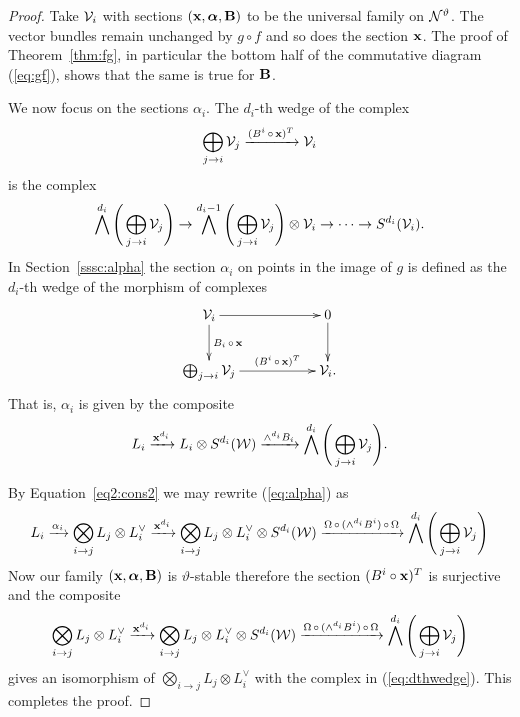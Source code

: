 \documentclass{amsart}
\newcommand{\balpha}{\boldsymbol{\alpha}}
\theoremstyle{definition}
\begin{document}
\begin{proof}
Take $\mathcal{V}_i$ with sections $(\bfx, \balpha, \bfB)$ to be the universal family on $\mathcal{N}^\vartheta$.
The vector bundles remain unchanged by $g \circ f$ and so does the section $\mathbf{x}$.
The proof of Theorem~\ref{thm:fg}, in particular the bottom half of the commutative diagram (\ref{eq:gf}), shows that the same is true for $\mathbf{B}$.

We now focus on the sections $\alpha_i$.
The $d_i$-th wedge of the complex
$$\bigoplus_{j \rightarrow i} \mathcal{V}_j \xrightarrow{(B^i \,\circ\, \mathbf{x})^T} \mathcal{V}_i$$
is the complex
\begin{equation}\label{eq:dthwedge}
    \bigwedge^{d_i} \Bigg(\bigoplus_{j \rightarrow i} \mathcal{V}_j \Bigg) \rightarrow \bigwedge^{d_i-1} \Bigg(\bigoplus_{j \rightarrow i} \mathcal{V}_j \Bigg) \otimes \mathcal{V}_i \rightarrow \cdots \rightarrow S^{d_i}(\mathcal{V}_i).
\end{equation}
In Section~\ref{sssc:alpha} the section $\alpha_i$ on points in the image of $g$ is defined as the $d_i$-th wedge of the morphism of complexes
\begin{equation*}
    \xymatrix{\cV_i \ar[rr] \ar[d]^{B_i \,\circ\, \bfx} && 0 \ar[d] \\
    \bigoplus_{j \rightarrow i} \cV_j \ar[rr]^-{(B^i \,\circ\, \bfx)^T} && \cV_i.}
\end{equation*}
That is, $\alpha_i$ is given by the composite 
\begin{equation}\label{eq:alpha}
    L_i \xrightarrow{\mathbf{x}^{d_i}} L_i \otimes S^{d_i}(\mathcal{W}) \xrightarrow{\wedge^{d_i} B_{i}} 
\bigwedge^{d_i} \Bigg(\bigoplus_{j \rightarrow i} \mathcal{V}_j \Bigg).
\end{equation}

By Equation~\eqref{eq2:cons2} we may rewrite (\ref{eq:alpha}) as 
$$L_i \xrightarrow{\alpha_i} \bigotimes_{i \rightarrow j} L_j  \otimes L_i^\vee \xrightarrow{\mathbf{x}^{d_i}} \bigotimes_{i \rightarrow j} L_j \otimes L_i^\vee \otimes S^{d_i}(\mathcal{W}) \xrightarrow{\Omega \,\circ\, (\wedge^{d_i} B^i) \,\circ\, \Omega} 
\bigwedge^{d_i} \Bigg(\bigoplus_{j \rightarrow i} \mathcal{V}_j \Bigg)$$
Now our family $(\bfx, \balpha, \bfB)$ is $\vartheta$-stable therefore the section $(B^i \circ \mathbf{x})^T$ is surjective and the composite $$\bigotimes_{i \rightarrow j} L_j  \otimes L_i^\vee \xrightarrow{\mathbf{x}^{d_i}} \bigotimes_{i \rightarrow j} L_j \otimes L_i^\vee \otimes S^{d_i}(\mathcal{W}) \xrightarrow{\Omega \,\circ\, (\wedge^{d_i} B^i) \,\circ\, \Omega} 
\bigwedge^{d_i} \Bigg(\bigoplus_{j \rightarrow i} \mathcal{V}_j \Bigg)$$
gives an isomorphism of $\bigotimes_{i \rightarrow j} L_j  \otimes L_i^\vee$ with the complex in (\ref{eq:dthwedge}).
This completes the proof.
\end{proof}
\end{document}
